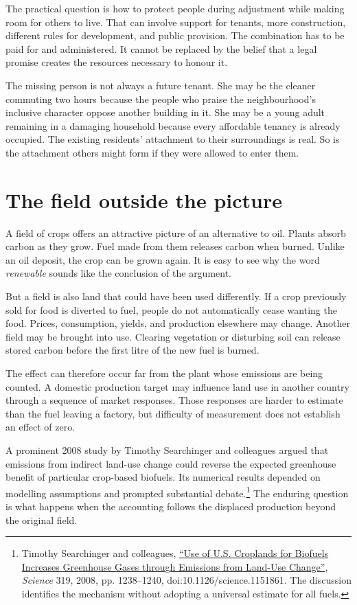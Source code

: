 \documentclass[12pt,a4paper]{book}
\begin{document}
The practical question is how to protect people during adjustment while making room for others to live. That can involve support for tenants, more construction, different rules for development, and public provision. The combination has to be paid for and administered. It cannot be replaced by the belief that a legal promise creates the resources necessary to honour it.

The missing person is not always a future tenant. She may be the cleaner commuting two hours because the people who praise the neighbourhood's inclusive character oppose another building in it. She may be a young adult remaining in a damaging household because every affordable tenancy is already occupied. The existing residents' attachment to their surroundings is real. So is the attachment others might form if they were allowed to enter them.

\section*{The field outside the picture}

A field of crops offers an attractive picture of an alternative to oil. Plants absorb carbon as they grow. Fuel made from them releases carbon when burned. Unlike an oil deposit, the crop can be grown again. It is easy to see why the word \emph{renewable} sounds like the conclusion of the argument.

But a field is also land that could have been used differently. If a crop previously sold for food is diverted to fuel, people do not automatically cease wanting the food. Prices, consumption, yields, and production elsewhere may change. Another field may be brought into use. Clearing vegetation or disturbing soil can release stored carbon before the first litre of the new fuel is burned.

The effect can therefore occur far from the plant whose emissions are being counted. A domestic production target may influence land use in another country through a sequence of market responses. Those responses are harder to estimate than the fuel leaving a factory, but difficulty of measurement does not establish an effect of zero.

A prominent 2008 study by Timothy Searchinger and colleagues argued that emissions from indirect land-use change could reverse the expected greenhouse benefit of particular crop-based biofuels. Its numerical results depended on modelling assumptions and prompted substantial debate.\footnote{Timothy Searchinger and colleagues, \href{https://searchinger.princeton.edu/publications/use-us-croplands-biofuels-increases-greenhouse-gases-through-emissions-land}{``Use of U.S. Croplands for Biofuels Increases Greenhouse Gases through Emissions from Land-Use Change''}, \emph{Science} 319, 2008, pp. 1238--1240, doi:10.1126/science.1151861. The discussion identifies the mechanism without adopting a universal estimate for all fuels.} The enduring question is what happens when the accounting follows the displaced production beyond the original field.
\end{document}
